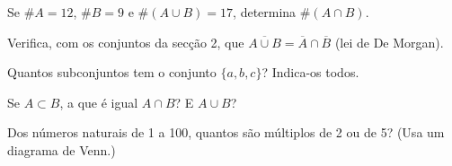 \documentclass[12pt]{article}
\begin{document}
\begin{exercicios}
  \item Se $\#A = 12$, $\#B = 9$ e $\#(A \cup B) = 17$, determina $\#(A \cap B)$.
  \item Verifica, com os conjuntos da secção 2, que $\overline{A \cup B} = \overline{A} \cap \overline{B}$ (lei de De Morgan).
  \item Quantos subconjuntos tem o conjunto $\{a, b, c\}$? Indica-os todos.
  \item Se $A \subset B$, a que é igual $A \cap B$? E $A \cup B$?
  \item Dos números naturais de 1 a 100, quantos são múltiplos de 2 ou de 5? (Usa um diagrama de Venn.)
\end{exercicios}
\end{document}
